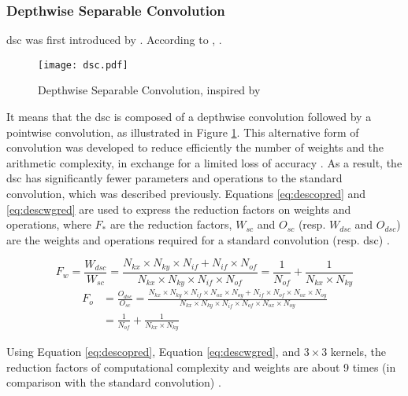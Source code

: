 \subsubsection{Depthwise Separable Convolution}  \label{subs:dsc}
\acrfull{dsc} was first introduced by \textcite{sifre_rigid-motion_2014}. According to \textcite{chollet_xception_2017}, .
%
\begin{figure}[ht]
    \texttt{[image: dsc.pdf]}
    \caption{Depthwise Separable Convolution, inspired by \cite{liu_fpga-based_2019, bai_cnn_2018}}
    \label{fig:dsc}
\end{figure}

It means that the \acrshort{dsc} is composed of a depthwise convolution followed by a pointwise convolution, as illustrated in Figure \ref{fig:dsc}. This alternative form of convolution was developed to reduce efficiently the number of weights and the arithmetic complexity, in exchange for a limited loss of accuracy \cite{liu_fpga-based_2019}. As a result, the \acrshort{dsc} has significantly fewer parameters and operations to the standard convolution, which was described previously. Equations \eqref{eq:descopred} and \eqref{eq:descwgred} are used to express the reduction factors on weights and operations, where $F_{*}$ are the reduction factors, $W_{sc}$ and $O_{sc}$ (resp. $W_{dsc}$ and $O_{dsc}$) are the weights and operations required for a standard convolution (resp. \acrshort{dsc}) \cite{liu_fpga-based_2019, bai_cnn_2018}.

\begin{equation}
    F_w = \frac{W_{dsc}}{W_{sc}} =
    \frac{N_{kx} \times N_{ky} \times N_{if} + N_{if} \times N_{of}}{N_{kx} \times N_{ky} \times N_{if} \times N_{of}} =
    \frac{1}{N_{of}} + \frac{1}{N_{kx} \times N_{ky}}
    \label{eq:descopred}
\end{equation}
%
\begin{equation}
    \begin{split}
        F_o &= \frac{O_{dsc}}{O_{sc}} = \frac{N_{kx} \times N_{ky} \times N_{if} \times N_{ox} \times N_{oy} + N_{if} \times N_{of} \times N_{ox} \times N_{oy}}{N_{kx} \times N_{ky} \times N_{if} \times N_{of} \times N_{ox} \times N_{oy}} \\
        &= \frac{1}{N_{of}} + \frac{1}{N_{kx} \times N_{ky}}
    \end{split}
    \label{eq:descwgred}
\end{equation}

Using Equation \eqref{eq:descopred}, Equation \eqref{eq:descwgred}, and $3 \times 3$ kernels, the reduction factors of computational complexity and weights are about 9 times (in comparison with the standard convolution) \cite{zhang_channel_2019}.